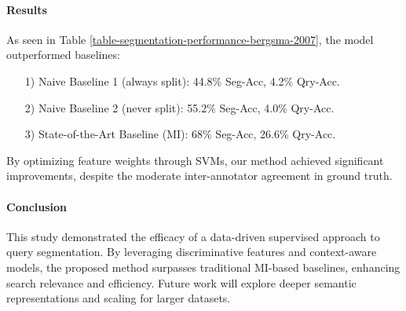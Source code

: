 

\paragraph*{Results}
As seen in Table \ref{table-segmentation-performance-bergsma-2007}, the model outperformed baselines:
\begin{enumerate}
\item[1)] Naive Baseline 1 (always split): 44.8\% Seg-Acc, 4.2\% Qry-Acc.
\item[2)] Naive Baseline 2 (never split): 55.2\% Seg-Acc, 4.0\% Qry-Acc.
\item[3)] State-of-the-Art Baseline (MI): 68\% Seg-Acc, 26.6\% Qry-Acc.
\end{enumerate}
By optimizing feature weights through SVMs, our method achieved significant improvements, despite the moderate inter-annotator agreement in ground truth.

\paragraph*{Conclusion}
This study demonstrated the efficacy of a data-driven supervised approach to query segmentation. By leveraging discriminative features and context-aware models, the proposed method surpasses traditional MI-based baselines, enhancing search relevance and efficiency. Future work will explore deeper semantic representations and scaling for larger datasets.